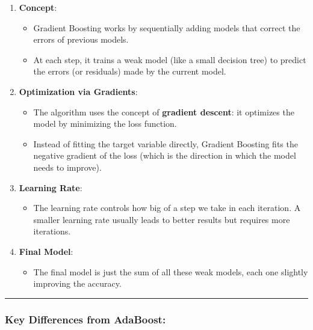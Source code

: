 \documentclass[12pt]{book}
\providecommand{\tightlist}{%
  \setlength{\itemsep}{0pt}\setlength{\parskip}{0pt}}
\begin{document}
\begin{enumerate}
\def\labelenumi{\arabic{enumi}.}
\tightlist
\item
  \textbf{Concept}:

  \begin{itemize}
  \tightlist
  \item
    Gradient Boosting works by sequentially adding models that correct
    the errors of previous models.
  \item
    At each step, it trains a weak model (like a small decision tree) to
    predict the errors (or residuals) made by the current model.
  \end{itemize}
\item
  \textbf{Optimization via Gradients}:

  \begin{itemize}
  \tightlist
  \item
    The algorithm uses the concept of \textbf{gradient descent}: it
    optimizes the model by minimizing the loss function.
  \item
    Instead of fitting the target variable directly, Gradient Boosting
    fits the negative gradient of the loss (which is the direction in
    which the model needs to improve).
  \end{itemize}
\item
  \textbf{Learning Rate}:

  \begin{itemize}
  \tightlist
  \item
    The learning rate controls how big of a step we take in each
    iteration. A smaller learning rate usually leads to better results
    but requires more iterations.
  \end{itemize}
\item
  \textbf{Final Model}:

  \begin{itemize}
  \tightlist
  \item
    The final model is just the sum of all these weak models, each one
    slightly improving the accuracy.
  \end{itemize}
\end{enumerate}

\begin{center}\rule{0.5\linewidth}{0.5pt}\end{center}

\subsubsection{Key Differences from
AdaBoost:}\label{key-differences-from-adaboost}
\end{document}
